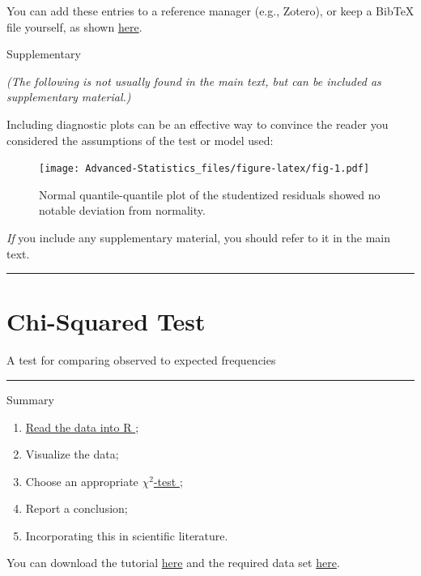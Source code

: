 \documentclass[
]{book}
\providecommand{\tightlist}{%
  \setlength{\itemsep}{0pt}\setlength{\parskip}{0pt}}
\begin{document}
You can add these entries to a reference manager (e.g., Zotero), or keep a BibTeX file yourself, as shown \href{https://youtu.be/zuuOYjE8m98}{here}.

Supplementary

\emph{(The following is not usually found in the main text, but can be included as supplementary material.)}

Including diagnostic plots can be an effective way to convince the reader you considered the assumptions of the test or model used:

\begin{figure}
\centering
\texttt{[image: Advanced-Statistics\_files/figure-latex/fig-1.pdf]}
\caption{\label{fig:fig}Normal quantile-quantile plot of the studentized residuals showed no notable deviation from normality.}
\end{figure}

\emph{If} you include any supplementary material, you should refer to it in the main text.

\begin{center}\rule{0.5\linewidth}{0.5pt}\end{center}

\hypertarget{chi-squared-test}{%
\chapter{Chi-Squared Test}\label{chi-squared-test}}

A test for comparing observed to expected frequencies

\begin{center}\rule{0.5\linewidth}{0.5pt}\end{center}

Summary

\begin{enumerate}
\def\labelenumi{\arabic{enumi}.}
\tightlist
\item
  \href{https://youtu.be/BGUqZc-Pb8w}{Read the data into R };
\item
  Visualize the data;
\item
  Choose an appropriate \href{https://youtu.be/PDl7mhpY4PI}{\(\chi^2\)-test };
\item
  Report a conclusion;
\item
  Incorporating this in scientific literature.
\end{enumerate}

You can download the tutorial \href{files/tutorial_chi-squared-test.Rmd}{here} and the required data set \href{data/binary-data.csv}{here}.
\end{document}
